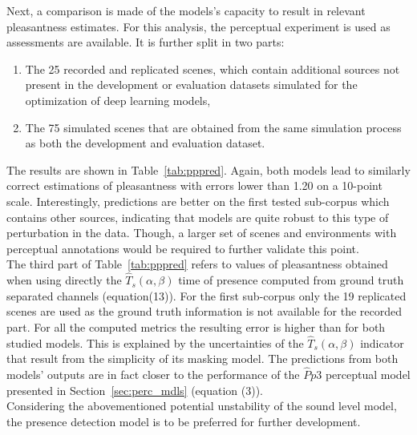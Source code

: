 \documentclass[11pt,a4paper]{article}
\begin{document}
Next, a comparison is made of the models's capacity to result in relevant pleasantness estimates. For this analysis, the perceptual experiment is used as assessments are available. It is further split in two parts:
\begin{enumerate}
\item The 25 recorded and replicated scenes, which contain additional sources not present in the development or evaluation datasets simulated for the optimization of deep learning models,
\item The 75 simulated scenes that are obtained from the same simulation process as both the development and evaluation dataset.
\end{enumerate}
The results are shown in Table~\ref{tab:pppred}. Again, both models lead to similarly correct estimations of pleasantness with errors lower than 1.20 on a 10-point scale. Interestingly, predictions are better on the first tested sub-corpus which contains other sources, indicating that models are quite robust to this type of perturbation in the data. Though, a larger set of scenes and environments with perceptual annotations would be required to further validate this point.\\

The third part of Table~\ref{tab:pppred} refers to values of pleasantness obtained when using directly the $\hat T_s(\alpha, \beta)$ time of presence computed from ground truth separated channels (equation(13)). For the first sub-corpus only the 19 replicated scenes are used as the ground truth information is not available for the recorded part. For all the computed metrics the resulting error is higher than for both studied models. This is explained by the uncertainties of the $\hat T_s(\alpha, \beta)$ indicator that result from the simplicity of its masking model. The predictions from both models' outputs are in fact closer to the performance of the $\hat Pp3$ perceptual model presented in Section~\ref{sec:perc_mdls} (equation (3)).\\

Considering the abovementioned potential unstability of the sound level model, the presence detection model is to be preferred for further development.
\end{document}

